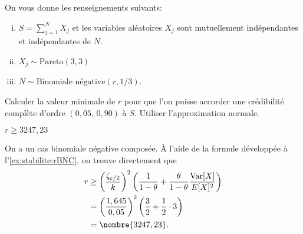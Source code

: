 \begin{exercice}
  On vous donne les renseignements suivants:
  \begin{enumerate}[(i)]
  \item $S = \sum_{j=1}^{N} X_j$ et les variables aléatoires
    $X_j$ sont mutuellement indépendantes et indépendantes de $N$.
  \item $X_j \sim \text{Pareto}(3, 3)$
  \item $N \sim \text{Binomiale négative}(r, 1/3)$.
  \end{enumerate}
  Calculer la valeur minimale de $r$ pour que l'on puisse accorder une
  crédibilité complète d'ordre $(0,05,\, 0,90)$ à $S$. Utiliser
  l'approximation normale.
  \begin{rep}
    $r \geq 3247,23$
  \end{rep}
  \begin{sol}
    On a un cas binomiale négative composée. À l'aide de la formule
    développée à l'\autoref{ex:stabilite:rBNC},
    on trouve directement que
    \begin{align*}
      r
      &\geq
      \left(
        \frac{\zeta_{\varepsilon/2}}{k}
      \right)^2
      \left(
        \frac{1}{1 - \theta} +
        \frac{\theta}{1-\theta} \frac{\var{X}}{\esp{X}^2}
      \right) \\
      &=
      \left(
        \frac{1,645}{0,05}
      \right)^2
      \left(
        \frac{3}{2} + \frac{1}{2} \cdot 3
      \right) \\
      &= \nombre{3247,23}.
    \end{align*}
  \end{sol}
\end{exercice}


